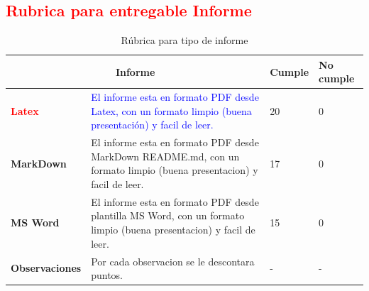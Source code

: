 \documentclass{article}
\begin{document}
        \subsection{\textcolor{red}{Rubrica para entregable Informe}}
            \begin{table}[ht]
                \centering
                \caption{Rúbrica para tipo de informe}
                \begin{tabular}{
                        |p{2.5cm}
                        |p{6cm}
                        |p{2cm}
                        |p{2cm} |}
                    \hline
                        \multicolumn{2}{|c|}{\textbf{Informe}} & \centerline{\textbf{Cumple}} & \centerline{\textbf{No cumple}} \\
                    \hline
                        \textbf{\textcolor{red}{Latex}} & \textcolor{blue}{El informe esta en formato PDF desde Latex, con un formato limpio (buena presentación) y facil de leer.} & \centerline{20} & \centerline{0} \\
                    \hline
                        \textbf{MarkDown} & El informe esta en formato PDF desde MarkDown README.md, con un formato limpio (buena presentacion) y facil de leer. & \centerline{17} & \centerline{0}\\
                    \hline
                        \textbf{MS Word} & El informe esta en formato PDF desde plantilla MS Word, con un formato limpio (buena presentacion) y facil de leer. & \centerline{15} & \centerline{0}\\
                    \hline
                        \textbf{Observaciones} & Por cada observacion se le descontara puntos. & \centerline{-} & \centerline{-}\\
                    \hline
                    \end{tabular}
                \label{tab:tab1}
            \end{table}
            
\end{document}
